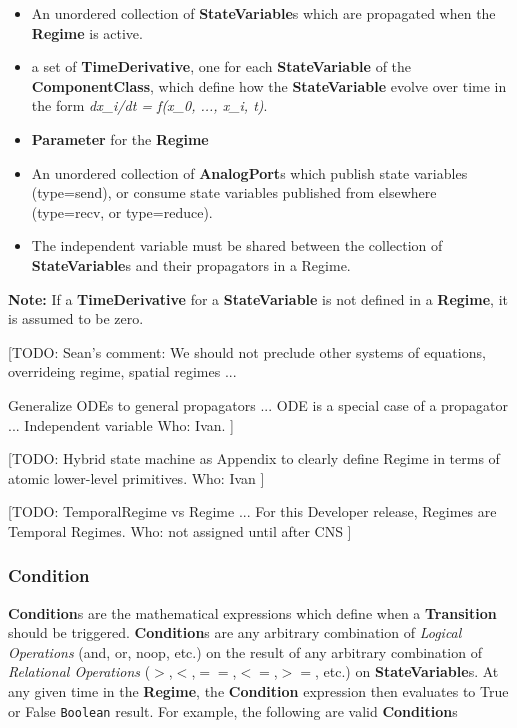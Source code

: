 \documentclass{article}
\newcommand{\note}[1]{%
\begin{center}
\colorbox{issuecolor}{\parbox{0.8\linewidth}{\textbf{Note:} #1}}
\end{center}%
}
\newcommand{\nmlClass}[1]{{\bf #1}}
\newcommand{\ComponentClass}{{\bf{ComponentClass}}\xspace}
\newcommand{\StateVariable}{{\bf{StateVariable}}\xspace}
\newcommand{\StateVariables}{{\bf{StateVariable}}s\xspace}
\newcommand{\TimeDerivative}{{\bf{TimeDerivative}}\xspace}
\newcommand{\Regime}{{\bf{Regime}}\xspace}
\newcommand{\Parameter}{{\bf{Parameter}}\xspace}
\begin{document}
\begin{itemize}
\item An unordered collection of \nmlClass{StateVariable}s which are
propagated when the \nmlClass{Regime} is active.
\item a set of \TimeDerivative, one for each \StateVariable
of the \ComponentClass, which define how the \StateVariable
evolve over time in the form \textsl{dx\_i/dt = f(x\_0, ..., x\_i, t)}.
\item \Parameter for the \nmlClass{Regime}
\item An unordered collection of \nmlClass{AnalogPort}s which publish state
variables (type=send), or consume state variables published from elsewhere
(type=recv, or type=reduce).
\item The independent variable must be shared between the collection
of \StateVariables and their propagators in a Regime.
\end{itemize}

\note{If a \textbf{TimeDerivative} for a \StateVariable is not defined
in a \Regime, it is assumed to be zero.}

[TODO:
Sean's comment:
We should not preclude other systems of equations,
overrideing regime, spatial regimes ...

Generalize ODEs to general propagators ...
ODE is a special case of a propagator ...
Independent variable
Who: Ivan.
]

[TODO: Hybrid state machine as Appendix to clearly define Regime
in terms of atomic lower-level primitives.
Who: Ivan
]

[TODO:
TemporalRegime vs Regime ...
For this Developer release, Regimes are Temporal Regimes.
Who: not assigned until after CNS
]

\subsubsection{Condition}

\nmlClass{Condition}s are the mathematical expressions which define
when a \nmlClass{Transition} should be triggered.
\nmlClass{Condition}s are any arbitrary combination of \emph{Logical
Operations} (and, or, noop, etc.) on the
result of any arbitrary combination of \emph{Relational Operations}
($>$,$<$,$==$,$<=$,$>=$, etc.) on
\nmlClass{StateVariable}s. At any given time in the \nmlClass{Regime},
the \nmlClass{Condition} expression then evaluates to True or False
{\tt Boolean} result. For example, the following are valid
\nmlClass{Condition}s
\end{document}
